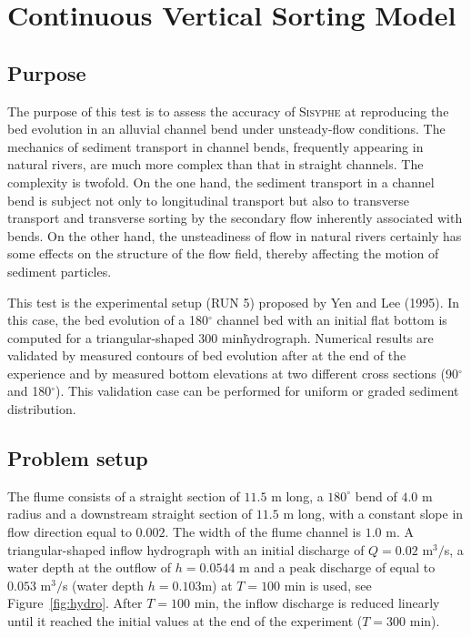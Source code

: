 \chapter{Continuous Vertical Sorting Model}
%

%
\section{Purpose}
%
The purpose of this test is to assess the accuracy of \textsc{Sisyphe} at
reproducing the bed evolution in an alluvial channel bend under unsteady-flow
conditions. The mechanics of sediment transport in channel bends, frequently
appearing in natural rivers, are much more complex than that in straight
channels. The complexity is twofold. On the one hand, the sediment transport in
a channel bend is subject not only to longitudinal transport but also to
transverse transport and transverse sorting by the secondary flow inherently
associated with bends. On the other hand, the unsteadiness of flow in natural
rivers certainly has some effects on the structure of the flow field, thereby
affecting the motion of sediment particles.

This test is the experimental setup (RUN 5) proposed by Yen and Lee (1995). In
this case, the bed evolution of a 180$^{\circ}$ channel bed with an initial
flat bottom is computed for a triangular-shaped $300$ min\. hydrograph.
Numerical results are validated by measured contours of bed evolution after at
the end of the experience and by measured bottom elevations at two different
cross sections (90$^{\circ}$ and 180$^{\circ}$). This validation case can be
performed for uniform or graded sediment distribution.
%
\section{Problem setup}
%
The flume consists of a straight section of $11.5$ m long, a $180^{\circ}$ bend
of $4.0$ m radius and a downstream straight section of $11.5$ m long, with a
constant slope in flow direction equal to $0.002$. The width of the flume
channel is $1.0$ m. A triangular-shaped inflow hydrograph with an initial
discharge of $Q=0.02$ m$^3/$s, a water depth at the outflow of $h = 0.0544$ m
and a peak discharge of equal to $0.053$ m$^3/$s (water depth $h=0.103$m) at $T
= 100$ min is used, see Figure~\ref{fig:hydro}. After $T = 100$ min, the inflow
discharge is reduced linearly until it reached the initial values at the end of
the experiment ($T = 300$ min).


